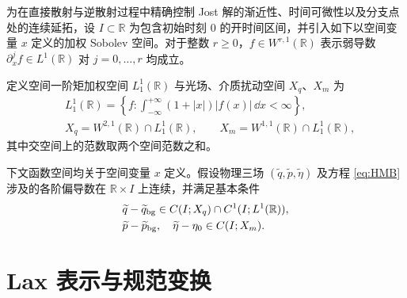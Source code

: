 为在直接散射与逆散射过程中精确控制 Jost 解的渐近性、时间可微性以及分支点处的连续延拓，设 $I\subset\mathbb R$ 为包含初始时刻 $0$ 的开时间区间，并引入如下以空间变量 $x$ 定义的加权 Sobolev 空间。对于整数 $r\ge0$，$f\in W^{r,1}(\mathbb R)$ 表示弱导数 $\partial_x^j f\in L^1(\mathbb R)$ 对 $j=0,\ldots,r$ 均成立。

\begin{definition}\label{def:perturbation-spaces}
定义空间一阶矩加权空间 $L^1_1(\mathbb R)$ 与光场、介质扰动空间 $X_q$、$X_m$ 为
\begin{equation}\label{eq:basic-spaces}
\begin{aligned}
&L^1_1(\mathbb R)=
\left\{f:\int_{-\infty}^{+\infty}(1+|x|)|f(x)|\,\dd x<\infty\right\},\\
&X_q=W^{2,1}(\mathbb R)\cap L^1_1(\mathbb R),\qquad
X_m=W^{1,1}(\mathbb R)\cap L^1_1(\mathbb R),
\end{aligned}
\end{equation}
其中交空间上的范数取两个空间范数之和。
\end{definition}

下文函数空间均关于空间变量 $x$ 定义。假设物理三场 $(\widetilde q,\widetilde p,\widetilde\eta)$ 及方程 \eqref{eq:HMB} 涉及的各阶偏导数在 $\mathbb R\times I$ 上连续，并满足基本条件
\begin{equation}\label{eq:physical-regularity}
\begin{aligned}
&\widetilde q-\widetilde q_{\rm bg}\in C(I;X_q)\cap C^1(I;L^1(\mathbb R)),\\
&\widetilde p-\widetilde p_{\rm bg},\quad\widetilde\eta-\eta_0\in C(I;X_m).
\end{aligned}
\end{equation}

\section{Lax 表示与规范变换}

